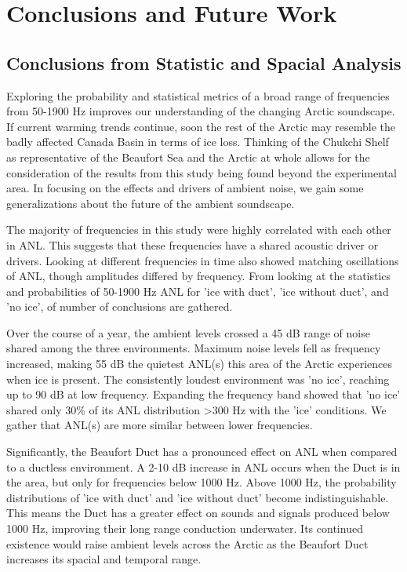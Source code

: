 
\chapter{Conclusions and Future Work}

\section{Conclusions from Statistic and Spacial Analysis}

Exploring the probability and statistical metrics of a broad range of frequencies from 50-1900 Hz improves our understanding of the changing Arctic soundscape. If current warming trends continue, soon the rest of the Arctic may resemble the badly affected Canada Basin in terms of ice loss. Thinking of the Chukchi Shelf as representative of the Beaufort Sea and the Arctic at whole allows for the consideration of the results from this study being found beyond the experimental area.  In focusing on the effects and drivers of ambient noise, we gain some generalizations about the future of the ambient soundscape.

The majority of frequencies in this study were highly correlated with each other in ANL. This suggests that these frequencies have a shared acoustic driver or drivers. Looking at different frequencies in time also showed matching oscillations of ANL, though amplitudes differed by frequency. From looking at the statistics and probabilities of 50-1900 Hz ANL for 'ice with duct', 'ice without duct', and 'no ice', of number of conclusions are gathered. 

Over the course of a year, the ambient levels crossed a 45 dB range of noise shared among the three environments. Maximum noise levels fell as frequency increased, making 55 dB the quietest ANL(s) this area of the Arctic experiences when ice is present. The consistently loudest environment was 'no ice', reaching up to 90 dB at low frequency. Expanding the frequency band showed that 'no ice' shared only 30\% of its  ANL distribution >300 Hz with the 'ice' conditions. We gather that ANL(s) are more similar between lower frequencies.

Significantly, the Beaufort Duct has a pronounced effect on ANL when compared to a ductless environment. A 2-10 dB increase in ANL occurs when the Duct is in the area, but only for frequencies below 1000 Hz. Above 1000 Hz, the probability distributions of 'ice with duct' and 'ice without duct' become indistinguishable. This means the Duct has a greater effect on sounds and signals produced below 1000 Hz, improving their long range conduction underwater. Its continued existence would raise ambient levels across the Arctic as the Beaufort Duct increases its spacial and temporal range.

